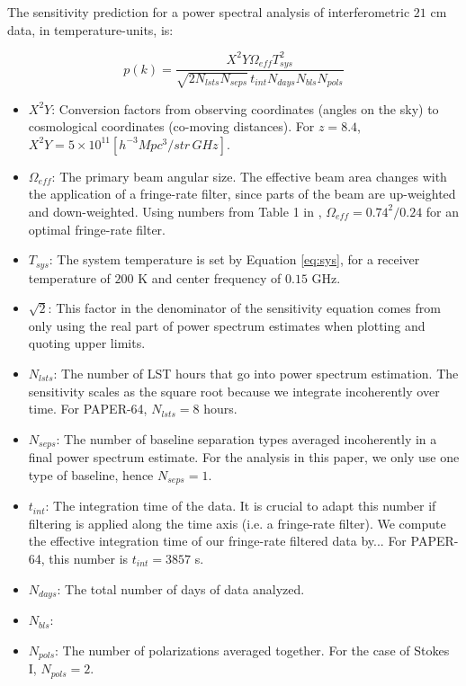 \documentclass[preprint2,numberedappendix,tighten,twocolappendix]{aastex6}  %
\begin{document}
The sensitivity prediction for a power spectral analysis of interferometric $21$ cm data, in temperature-units, is:

\begin{equation}
p(k) = \frac{X^{2}Y \Omega_{eff} T_{sys}^{2}}{\sqrt{2N_{lsts}N_{seps}}\,t_{int}N_{days}N_{bls}N_{pols}}
\end{equation}

\begin{itemize}
\item $X^{2}Y$: Conversion factors from observing coordinates (angles on the sky) to cosmological coordinates (co-moving distances). For $z=8.4$, $X^{2}Y = 5 \times 10^{11} [h^{-3} Mpc^{3} / str \, GHz]$.
\item $\Omega_{eff}$: The primary beam angular size. The effective beam area changes with the application of a fringe-rate filter, since parts of the beam are up-weighted and down-weighted. Using numbers from Table 1 in \citet{parsons_et_al2016}, $\Omega_{eff} = 0.74^{2}/0.24$ for an optimal fringe-rate filter. 
\item $T_{sys}$: The system temperature is set by Equation \ref{eq:sys}, for a receiver temperature of $200$ K and center frequency of $0.15$ GHz. 
\item $\sqrt{2}$: This factor in the denominator of the sensitivity equation comes from only using the real part of power spectrum estimates when plotting and quoting upper limits.
\item $N_{lsts}$: The number of LST hours that go into power spectrum estimation. The sensitivity scales as the square root because we integrate incoherently over time. For PAPER-64, $N_{lsts} = 8$ hours.
\item $N_{seps}$: The number of baseline separation types averaged incoherently in a final power spectrum estimate. For the analysis in this paper, we only use one type of baseline, hence $N_{seps}=1$.
\item $t_{int}$: The integration time of the data. It is crucial to adapt this number if filtering is applied along the time axis (i.e. a fringe-rate filter). We compute the effective integration time of our fringe-rate filtered data by... For PAPER-64, this number is $t_{int} = 3857$ s. 
\item $N_{days}$: The total number of days of data analyzed. 
\item $N_{bls}$:
\item $N_{pols}$: The number of polarizations averaged together. For the case of Stokes I, $N_{pols}=2$.
\end{itemize}
\end{document}
